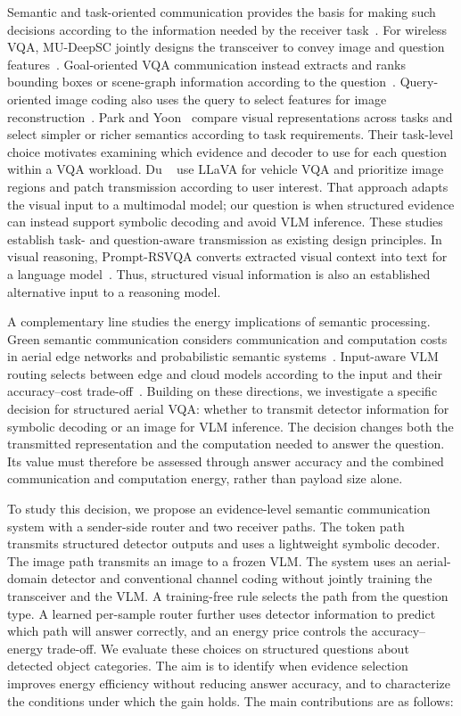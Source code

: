 Semantic and task-oriented communication provides the basis for making
such decisions according to the information needed by the receiver
task~\cite{gunduz2023beyond,strinati2021sixg,kountouris2021semantics}.
For wireless VQA, MU-DeepSC jointly designs the transceiver to convey
image and question features~\cite{xie2022mudeepscwcl}.
Goal-oriented VQA communication instead extracts and ranks bounding boxes
or scene-graph information according to the question~\cite{liu2024gosg}.
Query-oriented image coding also uses the query to select features for
image reconstruction~\cite{huang2026query}. Park and
Yoon~\cite{park2025transmit} compare visual representations across tasks
and select simpler or richer semantics according to task requirements.
Their task-level choice motivates examining which evidence and decoder
to use for each question within a VQA workload.
Du \etal~\cite{jiang2025lmmvn} use LLaVA for vehicle VQA and prioritize
image regions and patch transmission according to user interest.
That approach adapts the visual input to a multimodal model; our question
is when structured evidence can instead support symbolic decoding and
avoid VLM inference.
These studies establish task- and question-aware transmission as existing
design principles. In visual
reasoning, Prompt-RSVQA converts extracted visual context into text for a
language model~\cite{chappuis2022promptrsvqa}. Thus, structured visual
information is also an established alternative input to a reasoning
model.

A complementary line studies the energy implications of semantic
processing. Green semantic communication considers communication and
computation costs in aerial edge networks and probabilistic semantic
systems~\cite{zheng2024aerialee,dai2025pscom}. Input-aware VLM routing
selects between edge and cloud models according to the input and their
accuracy--cost trade-off~\cite{sabanovic2026inarvl}. Building on these
directions, we investigate a specific decision for structured aerial VQA:
whether to transmit detector information for symbolic decoding or an image
for VLM inference. The decision changes both the transmitted
representation and the computation needed to answer the question.
Its value must therefore be assessed through answer accuracy and the
combined communication and computation energy, rather than payload size
alone.

To study this decision, we propose an evidence-level semantic
communication system with a sender-side router and two receiver paths.
The token path transmits structured detector outputs and uses a
lightweight symbolic decoder. The image path transmits an image to a
frozen VLM. The system uses an aerial-domain detector and conventional
channel coding without jointly training the transceiver and the VLM.
A training-free rule selects the path from the question type. A learned
per-sample router further uses detector information to predict which path
will answer correctly, and an energy price controls the
accuracy--energy trade-off. We evaluate these choices on structured
questions about detected object categories. The aim is to identify when
evidence selection improves energy efficiency without reducing answer
accuracy, and to characterize the conditions under which the gain holds.
The main contributions are as follows:

